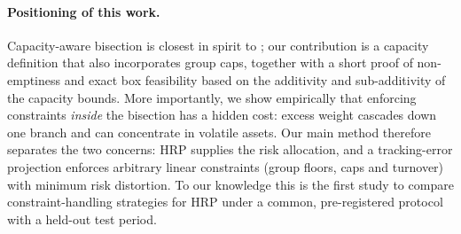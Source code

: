 \paragraph{Positioning of this work.} Capacity-aware bisection is closest in spirit to
\citet{pfitzinger2019}; our contribution is a capacity definition that also incorporates
group caps, together with a short proof of non-emptiness and exact box feasibility based on
the additivity and sub-additivity of the capacity bounds. More importantly, we show
empirically that enforcing constraints \emph{inside} the bisection has a hidden cost: excess
weight cascades down one branch and can concentrate in volatile assets. Our main method
therefore separates the two concerns: HRP supplies the risk allocation, and a
tracking-error projection \citep{roll1992} enforces arbitrary linear constraints
(group floors, caps and turnover) with minimum risk distortion. To our knowledge this is
the first study to compare constraint-handling strategies for HRP under a common,
pre-registered protocol with a held-out test period.
